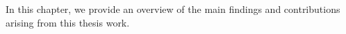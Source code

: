 In this chapter, we provide an overview of the main findings and contributions arising from this thesis work.